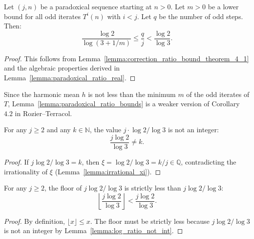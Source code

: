 \begin{corollary}\label{lemma:paradoxical_ratio_bounds}\leanok
Let $(j, n)$ be a paradoxical sequence starting at $n > 0$. Let $m > 0$ be a lower bound for all odd iterates $T^i(n)$ with $i < j$. Let $q$ be the number of odd steps. Then:
\begin{equation}
    \frac{\log 2}{\log(3 + 1/m)} \le \frac{q}{j} < \frac{\log 2}{\log 3}.
\end{equation}
\end{corollary}
\begin{proof}\leanok
This follows from Lemma~\ref{lemma:correction_ratio_bound_theorem_4_1} and the algebraic properties derived in Lemma~\ref{lemma:paradoxical_ratio_real}.
\end{proof}

  Since the harmonic mean $h$ is not less than the minimum $m$ of the odd iterates of $T$,
  Lemma~\ref{lemma:paradoxical_ratio_bounds} is a weaker version of Corollary~$4.2$ in Rozier--Terracol.

\begin{lemma}\label{lemma:log_ratio_not_int}\leanok
For any $j \ge 2$ and any $k \in \mathbb{N}$, the value $j \cdot \log 2 / \log 3$ is not an integer:
\begin{equation}
    \frac{j \log 2}{\log 3} \neq k.
\end{equation}
\end{lemma}
\begin{proof}\leanok
If $j \log 2 / \log 3 = k$, then $\xi = \log 2 / \log 3 = k/j \in \mathbb{Q}$, contradicting the irrationality of $\xi$ (Lemma~\ref{lemma:irrational_xi}).
\end{proof}

\begin{lemma}\label{lemma:strict_floor_log_ratio}\leanok
For any $j \ge 2$, the floor of $j \log 2 / \log 3$ is strictly less than $j \log 2 / \log 3$:
\begin{equation}
    \left\lfloor \frac{j \log 2}{\log 3} \right\rfloor < \frac{j \log 2}{\log 3}.
\end{equation}
\end{lemma}
\begin{proof}\leanok
By definition, $\lfloor x \rfloor \le x$. The floor must be strictly less because $j \log 2 / \log 3$ is not an integer by Lemma~\ref{lemma:log_ratio_not_int}.
\end{proof}

